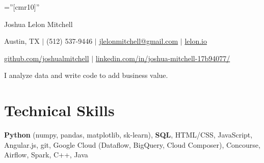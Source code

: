 \documentclass[a4paper,10pt]{article}
\begin{document}

\pagestyle{empty} %

\font\fb=''[cmr10]'' %

\par{\centering
		{\Huge Joshua Lelon Mitchell
	}\par}
\par{\centering
		{
	Austin, TX
	$\mid$
	(512) 537-9446
	$\mid$
	\href {mailto:jlelonmitchell@gmail.com}{jlelonmitchell@gmail.com}
	$\mid$
	\href {https://lelon.io/}{lelon.io}
	
	\href {https://github.com/joshualmitchell}{github.com/joshualmitchell}
	$\mid$
	\href {https://www.linkedin.com/in/joshua-mitchell-17b94077/}{linkedin.com/in/joshua-mitchell-17b94077/}
}\par}

\begin{center}
I analyze data and write code to add business value.
\end{center}
\section{Technical Skills}

\textbf{Python} (numpy, pandas, matplotlib, sk-learn), \textbf{SQL}, HTML/CSS, JavaScript, Angular.js, git, Google Cloud (Dataflow, BigQuery, Cloud Composer), Concourse, Airflow, Spark, C++, Java

\end{document}
